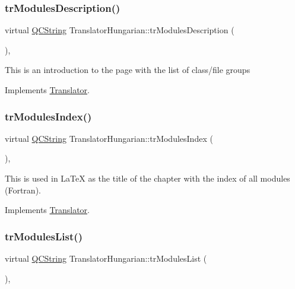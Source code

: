 \subsubsection{\texorpdfstring{trModulesDescription()}{trModulesDescription()}}
{\footnotesize\ttfamily virtual \mbox{\hyperlink{class_q_c_string}{Q\+C\+String}} Translator\+Hungarian\+::tr\+Modules\+Description (\begin{DoxyParamCaption}{ }\end{DoxyParamCaption})\hspace{0.3cm}{\ttfamily [inline]}, {\ttfamily [virtual]}}

This is an introduction to the page with the list of class/file groups 

Implements \mbox{\hyperlink{class_translator}{Translator}}.

\mbox{\label{class_translator_hungarian_a84cec1668ee66a03d61a9aa5507f43dd}} 
\subsubsection{\texorpdfstring{trModulesIndex()}{trModulesIndex()}}
{\footnotesize\ttfamily virtual \mbox{\hyperlink{class_q_c_string}{Q\+C\+String}} Translator\+Hungarian\+::tr\+Modules\+Index (\begin{DoxyParamCaption}{ }\end{DoxyParamCaption})\hspace{0.3cm}{\ttfamily [inline]}, {\ttfamily [virtual]}}

This is used in La\+TeX as the title of the chapter with the index of all modules (Fortran). 

Implements \mbox{\hyperlink{class_translator}{Translator}}.

\mbox{\label{class_translator_hungarian_a645cc04f1cee10e3ae7d6bb60872442e}} 
\subsubsection{\texorpdfstring{trModulesList()}{trModulesList()}}
{\footnotesize\ttfamily virtual \mbox{\hyperlink{class_q_c_string}{Q\+C\+String}} Translator\+Hungarian\+::tr\+Modules\+List (\begin{DoxyParamCaption}{ }\end{DoxyParamCaption})\hspace{0.3cm}{\ttfamily [inline]}, {\ttfamily [virtual]}}

